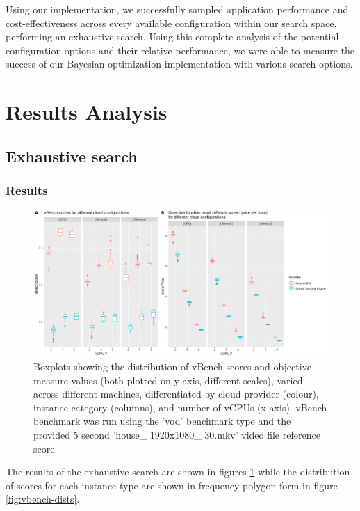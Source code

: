 \documentclass{report}
\begin{document}
Using our implementation, we successfully sampled application performance and cost-effectiveness across every available configuration within our search space, performing an exhaustive search. Using this complete analysis of the potential configuration options and their relative performance, we were able to measure the success of our Bayesian optimization implementation with various search options.

\section{Results Analysis}
\subsection{Exhaustive search}
\subsubsection{Results}
\begin{figure}
  \centering
   \includegraphics[scale=0.6]{exh_search}
   \caption{Boxplots showing the distribution of vBench scores and objective measure values (both plotted on y-axis, different scales), varied across different machines, differentiated by cloud provider (colour), instance category (columns), and number of vCPUs (x axis). vBench benchmark was run using the 'vod' benchmark type and the provided 5 second 'house\_ 1920x1080\_ 30.mkv' video file reference score.}
  \label{fig:exh-search}
\end{figure}

The results of the exhaustive search are shown in figures \ref{fig:exh-search} while the distribution of scores for each instance type are shown in frequency polygon form in figure \ref{fig:vbench-dists}.
\end{document}
